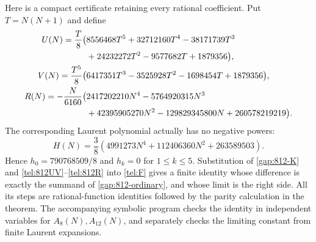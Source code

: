 Here is a compact certificate retaining every rational coefficient.
Put $T=N(N+1)$ and define
\begin{align}\label{tel:812UV}
 U(N)=\frac{T}{8}\bigl(&8556468T^5+32712160T^4-38171739T^3\notag\\
      &+24232272T^2-9577682T+1879356\bigr),\\
 V(N)=\frac{T^5}{8}\bigl(&6417351T^3-3525928T^2-1698454T+1879356\bigr),\notag\\
 R(N)=-\frac{N}{6160}\bigl(&2417202210N^4-5764920315N^3\notag\\
      &+42395905270N^2-129829345800N+260578219219\bigr).
      \label{tel:812R}
\end{align}
The corresponding Laurent polynomial actually has no negative powers:
\[
 H(N)=\frac38\left(4991273N^4+112406360N^2+263589503\right).
\]
Hence $h_0=790768509/8$ and $h_k=0$ for $1\le k\le5$.
Substitution of \eqref{gap:812-K} and \eqref{tel:812UV}--\eqref{tel:812R} into
\eqref{tel:F} gives a finite identity whose difference is exactly
the summand of \eqref{gap:812-ordinary}, and whose limit is the right
side. All its steps are rational-function identities followed by the
parity calculation in the theorem. The accompanying symbolic program
checks the identity in independent variables for $A_8(N),A_{12}(N)$,
and separately checks the limiting constant from finite Laurent
expansions.
